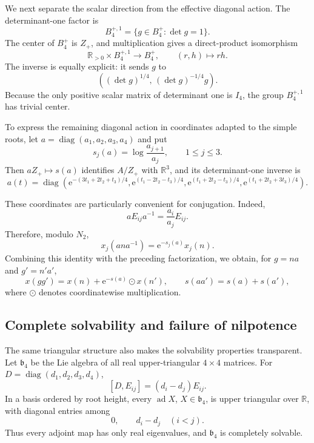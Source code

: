 \documentclass[reqno]{amsart}
\numberwithin{equation}{section}
\theoremstyle{definition}
\theoremstyle{remark}
\newcommand{\R}{\mathbb R}
\newcommand{\ad}{\operatorname{ad}}
\newcommand{\e}{\mathrm e}
\begin{document}
We next separate the scalar direction from the effective diagonal action.
The determinant-one factor is
\[
 B_4^{+,1}=\{g\in B_4^+:\det g=1\}.
\]
The center of $B_4^+$ is $Z_+$, and multiplication gives a direct-product
isomorphism
\begin{equation}
 \R_{>0}\times B_4^{+,1}\longrightarrow B_4^+,
 \qquad
 (r,h)\longmapsto rh.
 \label{eq:B4-scalar-splitting}
\end{equation}
The inverse is equally explicit: it sends $g$ to
\[
 \left((\det g)^{1/4},\,(\det g)^{-1/4}g\right).
\]
Because the only positive scalar matrix of determinant one is $I_4$, the
group $B_4^{+,1}$ has trivial center.

To express the remaining diagonal action in coordinates adapted to the
simple roots, let $a=\operatorname{diag}(a_1,a_2,a_3,a_4)$ and put
\begin{equation}
 s_j(a)=\log\frac{a_{j+1}}{a_j},
 \qquad 1\leq j\leq3.
 \label{eq:B4-simple-root-coordinates}
\end{equation}
Then $aZ_+\mapsto s(a)$ identifies $A/Z_+$ with $\R^3$, and its
determinant-one inverse is
\begin{equation}
 a(t)=\operatorname{diag}\left(
 \e^{-(3t_1+2t_2+t_3)/4},
 \e^{(t_1-2t_2-t_3)/4},
 \e^{(t_1+2t_2-t_3)/4},
 \e^{(t_1+2t_2+3t_3)/4}
 \right).
 \label{eq:B4-diagonal-section}
\end{equation}

These coordinates are particularly convenient for conjugation.  Indeed,
\[
 aE_{ij}a^{-1}=\frac{a_i}{a_j}E_{ij}.
\]
Therefore, modulo $N_2$,
\[
 x_j(ana^{-1})=\e^{-s_j(a)}x_j(n).
\]
Combining this identity with the preceding factorization, we obtain, for
$g=na$ and $g'=n'a'$,
\begin{equation}
 x(gg')=x(n)+\e^{-s(a)}\odot x(n'),
 \qquad
 s(aa')=s(a)+s(a'),
 \label{eq:B4-effective-law}
\end{equation}
where $\odot$ denotes coordinatewise multiplication.

\subsection{Complete solvability and failure of nilpotence}

The same triangular structure also makes the solvability properties
transparent.  Let $\mathfrak b_4$ be the Lie algebra of all real
upper-triangular $4\times4$ matrices.  For
$D=\operatorname{diag}(d_1,d_2,d_3,d_4)$,
\[
 [D,E_{ij}]=(d_i-d_j)E_{ij}.
\]
In a basis ordered by root height, every $\ad X$, $X\in\mathfrak b_4$,
is upper triangular over $\R$, with diagonal entries among
\[
 0,\qquad d_i-d_j\quad (i<j).
\]
Thus every adjoint map has only real eigenvalues, and $\mathfrak b_4$ is
completely solvable.
\end{document}
